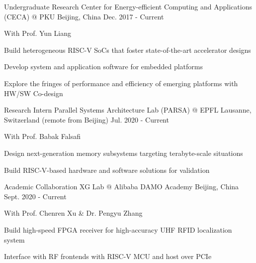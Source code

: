 

\begin{cventries}

  \cventry
    {Undergraduate Research} %
    {Center for Energy-efficient Computing and Applications (CECA) @ PKU} %
    {Beijing, China} %
    {Dec. 2017 - Current} %
    {
      \begin{cvitems} %
      \item {With Prof. Yun Liang}
        \item {Build heterogeneous RISC-V SoCs that foster state-of-the-art accelerator designs}
        \item {Develop system and application software for embedded platforms}
        \item {Explore the fringes of performance and efficiency of emerging platforms with HW/SW Co-design}
      \end{cvitems}
    }

  \cventry
    {Research Intern} %
    {Parallel Systems Architecture Lab (PARSA) @ EPFL} %
    {Lausanne, Switzerland \newline (remote from Beijing)} %
    {Jul. 2020 - Current} %
    {
      \begin{cvitems} %
      \item {With Prof. Babak Falsafi}
        \item {Design next-generation memory subsystems targeting terabyte-scale situations}
        \item {Build RISC-V-based hardware and software solutions for validation}
      \end{cvitems}
    }

  \cventry
    {Academic Collaboration} %
    {XG Lab @ Alibaba DAMO Academy} %
    {Beijing, China} %
    {Sept. 2020 - Current} %
    {
      \begin{cvitems} %
      \item {With Prof. Chenren Xu \& Dr. Pengyu Zhang}
        \item {Build high-speed FPGA receiver for high-accuracy UHF RFID localization system}
        \item {Interface with RF frontends with RISC-V MCU and host over PCIe}
      \end{cvitems}
    }


\end{cventries}
